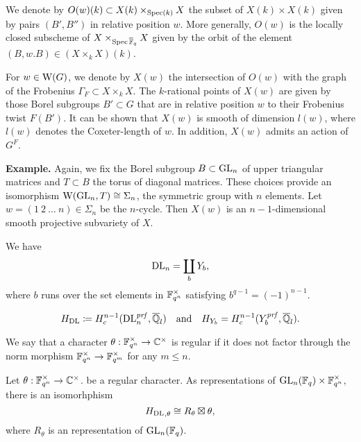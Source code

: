 \documentclass[../main.tex]{subfiles}
\begin{document}
We denote by $O(w)(k) \subset X(k) \times_{\operatorname{Spec}(k)} X$ the subset
of $X(k) \times X(k)$ given by pairs $(B', B'')$ in relative position $w$. 
More generally, $O(w)$ is the locally closed subscheme of $X \times_{\operatorname{Spec} \overline
{\mathbb{F}}_q} X$ given by the orbit of the element $(B, w. B) \in (X \times_k X)(k)$. 

For $w \in \mathrm W(G)$, we denote by $X(w)$ the intersection of $O(w)$ with the graph
of the Frobenius $\Gamma_F \subset X \times_k X$. The $k$-rational points of $X(w)$ 
are given by those Borel subgroups $B' \subset G$ that are in relative 
position $w$ to their Frobenius twist $F(B')$. It can be shown that 
$X(w)$ is smooth of dimension $l(w)$, where $l(w)$ denotes the Coxeter-length
of $w$. In addition, $X(w)$ admits an action of $G^F$. 

\textbf{Example.}
Again, we fix the Borel subgroup $B \subset \operatorname{GL}_n$ of upper triangular matrices
and $T \subset B$ the torus of diagonal matrices. These choices provide an isomorphism
$\mathrm W(\operatorname{GL}_n,T) \cong \Sigma_n$, the symmetric group with $n$ elements.
Let $w = (1\ 2\ \dots\ n) \in \Sigma_n$ be the $n$-cycle. Then $X(w)$ is an
$n-1$-dimensional
smooth projective subvariety of $X$. 

\begin{defi}\label{def:DLVariety}
  \todo{}
\end{defi}

\begin{lem}
  We have $$\mathrm{DL}_n = \coprod_{b} Y_b,$$
  where $b$ runs over the set elements in $\mathbb{F}_{q^n}^\times$ satisfying 
  $b^{q-1} = (-1)^{n-1}$. 
\end{lem}

\begin{equation} \label{eq:defDLCohom}
  H_\mathrm{DL} \coloneqq H^{n-1}_c(\mathrm{DL}_n^{\mathit{prf}}, \overline {\mathbb{Q}}_l) \quad \text{and} \quad
  H_{Y_b} = H^{n-1}_c(Y_b^{\mathit{prf}}, \overline {\mathbb{Q}}_l).
\end{equation}

\begin{defi}
  We say that a character $\theta: \mathbb{F}_{q^n}^\times \to \mathbb{C}^\times$ is 
  regular if it does not factor through the norm morphism
  $\mathbb{F}_{q^n}^\times \to \mathbb{F}_{q^m}^\times$ for any $m \leq n$.
\end{defi}

\begin{prop} \label{prop:DLCorrespondence}
  Let $\theta: \mathbb{F}_{q^n}^\times \to \mathbb{C}^\times$. be a regular character.
  As representations of $\operatorname{GL}_n(\mathbb{F}_q) \times \mathbb{F}_{q^n}^\times$, there is an
  isomorhphism 
  \begin{equation*}
    {H_\mathrm{DL}}_{, \theta} \cong  R_\theta \boxtimes \theta,
  \end{equation*}
  where $R_\theta$ is an  representation of $\operatorname{GL}_n(\mathbb{F}_q)$. 
\end{prop}
\end{document}
